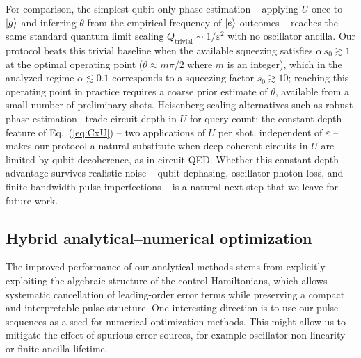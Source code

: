 \documentclass[aps,prx,showpacs,notitlepage,twocolumn,superscriptaddress,nofootinbib,preprintnumbers,floatfix,10pt, longbibliography]{revtex4-2}
\begin{document}
For comparison, the simplest qubit-only phase estimation -- applying
$U$ once to $\ket{g}$ and inferring $\theta$ from the empirical
frequency of $\ket{e}$ outcomes -- reaches the same standard quantum
limit scaling $Q_{\mathrm{trivial}}\sim 1/\varepsilon^2$ with no
oscillator ancilla. Our protocol beats this trivial baseline when
the available squeezing satisfies $\alpha\,s_0\gtrsim 1$ at the
optimal operating point ($\theta\approx m\pi/2$ where $m$ is an integer), which in
the analyzed regime $\alpha\lesssim 0.1$ corresponds to a squeezing
factor $s_0\gtrsim 10$; reaching this operating point in practice
requires a coarse prior estimate of $\theta$, available from a small
number of preliminary shots. Heisenberg-scaling alternatives such as
robust phase estimation~\cite{HigginsRPE2007,KimmelRPE2015} trade
circuit depth in $U$ for query count; the constant-depth feature of
Eq.~(\ref{eq:CxU}) -- two applications of $U$ per shot, independent
of $\varepsilon$ -- makes our protocol a natural substitute when
deep coherent circuits in $U$ are limited by qubit decoherence, as
in circuit QED. Whether this constant-depth advantage survives
realistic noise -- qubit dephasing, oscillator photon loss, and
finite-bandwidth pulse imperfections -- is a natural next step that
we leave for future work.

\subsection{Hybrid analytical--numerical optimization}\label{hybrid-opt}

The improved performance of our analytical methods stems from explicitly
exploiting the algebraic structure of the control Hamiltonians, which
allows systematic cancellation of leading-order error terms while
preserving a compact and interpretable pulse structure. One interesting direction is to use our pulse sequences as a seed for numerical optimization methods. This might allow us to mitigate the effect of spurious error sources, for example oscillator non-linearity or finite ancilla lifetime. 


\end{document}
